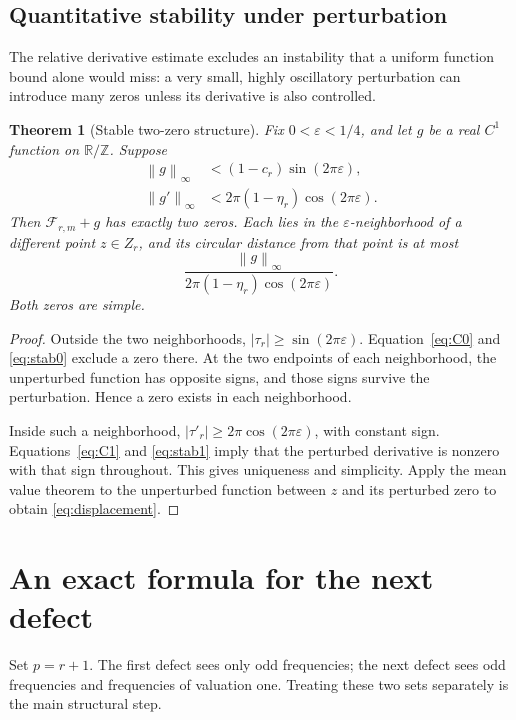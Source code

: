 \documentclass[11pt,a4paper]{article}
\numberwithin{equation}{section}
\theoremstyle{plain}
\newtheorem{theorem}{Theorem}[section]
\theoremstyle{definition}
\theoremstyle{remark}
\newcommand{\T}{\mathbb R/\mathbb Z}
\newcommand{\norm}[1]{\left\lVert#1\right\rVert}
\begin{document}
\subsection{Quantitative stability under perturbation}

The relative derivative estimate excludes an instability that a uniform
function bound alone would miss: a very small, highly oscillatory
perturbation can introduce many zeros unless its derivative is also
controlled.

\begin{theorem}[Stable two-zero structure]\label{thm:stability}
Fix $0<\varepsilon<1/4$, and let $g$ be a real $C^1$ function on $\T$.
Suppose
\begin{align}
 \norm{g}_\infty&<(1-c_r)\sin(2\pi\varepsilon),\label{eq:stab0}\\
 \norm{g'}_\infty&<2\pi(1-\eta_r)\cos(2\pi\varepsilon).
 \label{eq:stab1}
\end{align}
Then $\mathcal F_{r,m}+g$ has exactly two zeros. Each lies in the
$\varepsilon$-neighborhood of a different point $z\in Z_r$, and its
circular distance from that point is at most
\begin{equation}\label{eq:displacement}
 \frac{\norm{g}_\infty}
 {2\pi(1-\eta_r)\cos(2\pi\varepsilon)}.
\end{equation}
Both zeros are simple.
\end{theorem}
\begin{proof}
Outside the two neighborhoods, $|\tau_r|\ge\sin(2\pi\varepsilon)$.
Equation~\eqref{eq:C0} and \eqref{eq:stab0} exclude a zero there. At the
two endpoints of each neighborhood, the unperturbed function has opposite
signs, and those signs survive the perturbation. Hence a zero exists in
each neighborhood.

Inside such a neighborhood, $|\tau'_r|\ge2\pi\cos(2\pi\varepsilon)$,
with constant sign. Equations~\eqref{eq:C1} and \eqref{eq:stab1} imply
that the perturbed derivative is nonzero with that sign throughout. This
gives uniqueness and simplicity. Apply the mean value theorem to the
unperturbed function between $z$ and its perturbed zero to obtain
\eqref{eq:displacement}.
\end{proof}

\section{An exact formula for the next defect}
\label{sec:next}

Set $p=r+1$. The first defect sees only odd frequencies; the next defect
sees odd frequencies and frequencies of valuation one. Treating these two
sets separately is the main structural step.
\end{document}
